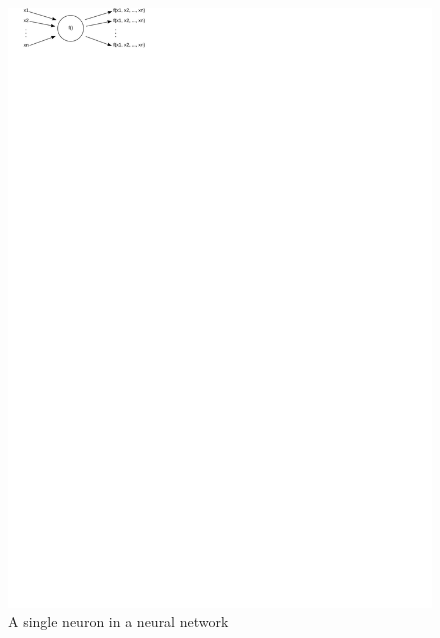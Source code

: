 \documentclass{article}
\begin{document}
\begin{figure}
  \includegraphics[scale=0.35]{neuron}
  \caption{A single neuron in a neural network}
  \label{fig:neuron}
\end{figure}
\end{document}
